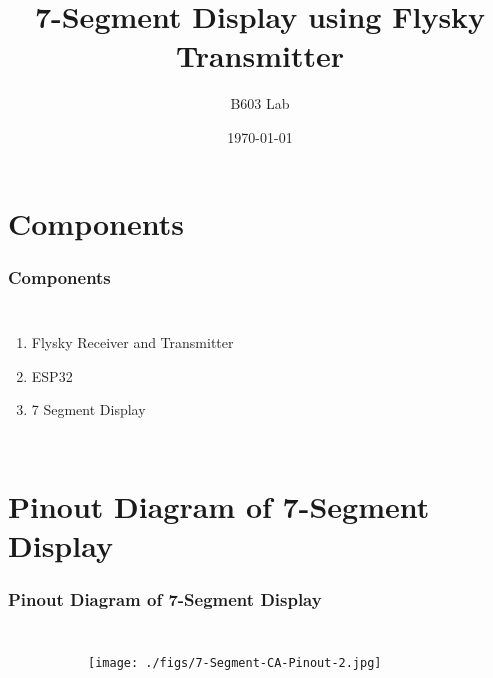 \documentclass{beamer}
\title{7-Segment Display using Flysky Transmitter}
\author{B603 Lab}
\institute{Indian Institute of Technology, Hyderabad.}
\date{\today}
\begin{document}
\begin{frame}
\titlepage
\end{frame}


\section{Components}
\begin{frame}
\frametitle{Components}
\begin{columns}
  \begin{enumerate}
  \item Flysky Receiver and Transmitter
  \vspace{10pt}
  \item ESP32
  \vspace{10pt}
  \item 7 Segment Display
  
  
  \end{enumerate}
  
\end{columns}

\end{frame}

\section{Pinout Diagram of 7-Segment Display}
\begin{frame}
\frametitle{Pinout Diagram of 7-Segment Display}
\begin{columns}
\begin{figure}[h!]
  \centering
  \begin{subfigure}[b]{0.75\linewidth}
    \texttt{[image: ./figs/7-Segment-CA-Pinout-2.jpg]}
  \end{subfigure}

\end{figure}



  
\end{columns}



\end{frame}
\end{document}
